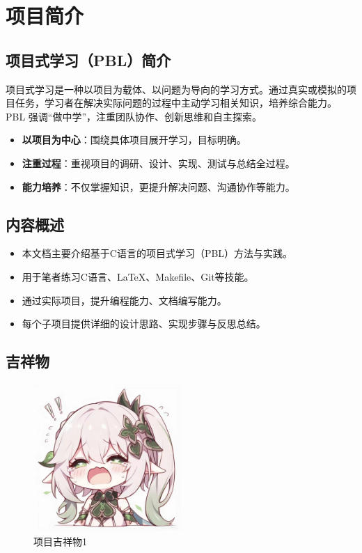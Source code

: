\chapter{项目简介}

\section{项目式学习（PBL）简介}

项目式学习是一种以项目为载体、以问题为导向的学习方式。通过真实或模拟的项目任务，学习者在解决实际问题的过程中主动学习相关知识，培养综合能力。PBL 强调“做中学”，注重团队协作、创新思维和自主探索。

\begin{itemize}
    \item \textbf{以项目为中心}：围绕具体项目展开学习，目标明确。
    \item \textbf{注重过程}：重视项目的调研、设计、实现、测试与总结全过程。
    \item \textbf{能力培养}：不仅掌握知识，更提升解决问题、沟通协作等能力。
\end{itemize}

\section{内容概述}

\begin{itemize}
    \item 本文档主要介绍基于C语言的项目式学习（PBL）方法与实践。
    \item 用于笔者练习C语言、\LaTeX、Makefile、Git等技能。
    \item 通过实际项目，提升编程能力、文档编写能力。
    \item 每个子项目提供详细的设计思路、实现步骤与反思总结。
\end{itemize}

\section{吉祥物}

\begin{figure}[htbp]
    \centering
    \includegraphics[width=0.5\textwidth]{images/1_4_xcs.jpg}
    \caption{项目吉祥物1}
    \label{fig:mascot}
\end{figure}

